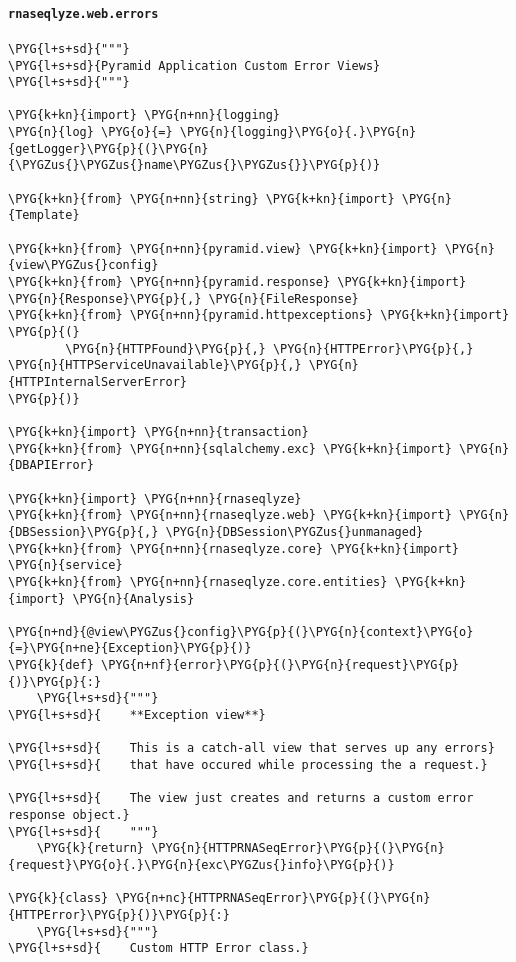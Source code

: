 \paragraph{\texttt{rnaseqlyze.web.errors}}
\label{index-pdf4:rnaseqlyze-web-errors}
\begin{Verbatim}[commandchars=\\\{\}]
\PYG{l+s+sd}{"""}
\PYG{l+s+sd}{Pyramid Application Custom Error Views}
\PYG{l+s+sd}{"""}

\PYG{k+kn}{import} \PYG{n+nn}{logging}
\PYG{n}{log} \PYG{o}{=} \PYG{n}{logging}\PYG{o}{.}\PYG{n}{getLogger}\PYG{p}{(}\PYG{n}{\PYGZus{}\PYGZus{}name\PYGZus{}\PYGZus{}}\PYG{p}{)}

\PYG{k+kn}{from} \PYG{n+nn}{string} \PYG{k+kn}{import} \PYG{n}{Template}

\PYG{k+kn}{from} \PYG{n+nn}{pyramid.view} \PYG{k+kn}{import} \PYG{n}{view\PYGZus{}config}
\PYG{k+kn}{from} \PYG{n+nn}{pyramid.response} \PYG{k+kn}{import} \PYG{n}{Response}\PYG{p}{,} \PYG{n}{FileResponse}
\PYG{k+kn}{from} \PYG{n+nn}{pyramid.httpexceptions} \PYG{k+kn}{import} \PYG{p}{(}
        \PYG{n}{HTTPFound}\PYG{p}{,} \PYG{n}{HTTPError}\PYG{p}{,} \PYG{n}{HTTPServiceUnavailable}\PYG{p}{,} \PYG{n}{HTTPInternalServerError}
\PYG{p}{)}

\PYG{k+kn}{import} \PYG{n+nn}{transaction}
\PYG{k+kn}{from} \PYG{n+nn}{sqlalchemy.exc} \PYG{k+kn}{import} \PYG{n}{DBAPIError}

\PYG{k+kn}{import} \PYG{n+nn}{rnaseqlyze}
\PYG{k+kn}{from} \PYG{n+nn}{rnaseqlyze.web} \PYG{k+kn}{import} \PYG{n}{DBSession}\PYG{p}{,} \PYG{n}{DBSession\PYGZus{}unmanaged}
\PYG{k+kn}{from} \PYG{n+nn}{rnaseqlyze.core} \PYG{k+kn}{import} \PYG{n}{service}
\PYG{k+kn}{from} \PYG{n+nn}{rnaseqlyze.core.entities} \PYG{k+kn}{import} \PYG{n}{Analysis}

\PYG{n+nd}{@view\PYGZus{}config}\PYG{p}{(}\PYG{n}{context}\PYG{o}{=}\PYG{n+ne}{Exception}\PYG{p}{)}
\PYG{k}{def} \PYG{n+nf}{error}\PYG{p}{(}\PYG{n}{request}\PYG{p}{)}\PYG{p}{:}
    \PYG{l+s+sd}{"""}
\PYG{l+s+sd}{    **Exception view**}

\PYG{l+s+sd}{    This is a catch-all view that serves up any errors}
\PYG{l+s+sd}{    that have occured while processing the a request.}

\PYG{l+s+sd}{    The view just creates and returns a custom error response object.}
\PYG{l+s+sd}{    """}
    \PYG{k}{return} \PYG{n}{HTTPRNASeqError}\PYG{p}{(}\PYG{n}{request}\PYG{o}{.}\PYG{n}{exc\PYGZus{}info}\PYG{p}{)}

\PYG{k}{class} \PYG{n+nc}{HTTPRNASeqError}\PYG{p}{(}\PYG{n}{HTTPError}\PYG{p}{)}\PYG{p}{:}
    \PYG{l+s+sd}{"""}
\PYG{l+s+sd}{    Custom HTTP Error class.}


\end{Verbatim}
